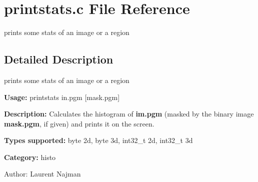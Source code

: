 \section{printstats.c File Reference}
\label{printstats_8c}
prints some stats of an image or a region  




\label{_details}
\subsection{Detailed Description}
prints some stats of an image or a region 

{\bf Usage:} printstats in.pgm [mask.pgm]

{\bf Description:} Calculates the histogram of {\bf im.pgm} (masked by the binary image {\bf mask.pgm}, if given) and prints it on the screen.

{\bf Types supported:} byte 2d, byte 3d, int32\_\-t 2d, int32\_\-t 3d

{\bf Category:} histo

\begin{Desc}
\item[Author:]Laurent Najman \end{Desc}
